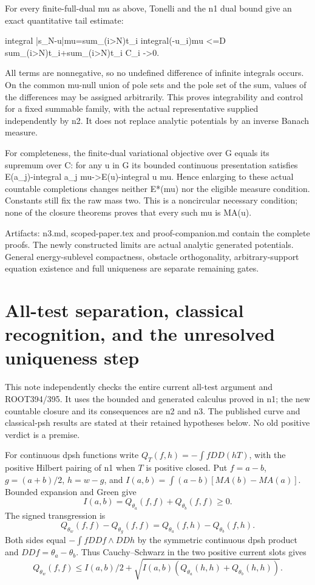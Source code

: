 \documentclass[11pt]{article}
\begin{document}
For every finite-full-dual mu as above, Tonelli and the n1 dual bound give an exact quantitative tail estimate:

integral |s\_N-u|mu=sum\_(i>N)t\_i integral(-u\_i)mu
<=D sum\_(i>N)t\_i+sum\_(i>N)t\_i C\_i ->0.

All terms are nonnegative, so no undefined difference of infinite integrals occurs. On the common mu-null union of pole sets and the pole set of the sum, values of the differences may be assigned arbitrarily. This proves integrability and control for a fixed summable family, with the actual representative supplied independently by n2. It does not replace analytic potentials by an inverse Banach measure.

For completeness, the finite-dual variational objective over G equals its supremum over C: for any u in G its bounded continuous presentation satisfies E(a\_j)-integral a\_j mu->E(u)-integral u mu. Hence enlarging to these actual countable completions changes neither E*(mu) nor the eligible measure condition. Constants still fix the raw mass two. This is a noncircular necessary condition; none of the closure theorems proves that every such mu is MA(u).

Artifacts: n3.md, scoped-paper.tex and proof-companion.md contain the complete proofs. The newly constructed limits are actual analytic generated potentials. General energy-sublevel compactness, obstacle orthogonality, arbitrary-support equation existence and full uniqueness are separate remaining gates.

\section*{All-test separation, classical recognition, and the unresolved uniqueness step}

This note independently checks the entire current all-test argument and ROOT394/395. It uses the bounded and generated calculus proved in n1; the new countable closure and its consequences are n2 and n3. The published curve and classical-psh results are stated at their retained hypotheses below. No old positive verdict is a premise.

For continuous dpsh functions write $Q_T(f,h)=-\int fDD(hT)$, with the positive Hilbert pairing of n1 when $T$ is positive closed. Put $f=a-b$, $g=(a+b)/2$, $h=w-g$, and $I(a,b)=\int(a-b)[MA(b)-MA(a)]$. Bounded expansion and Green give
\[
 I(a,b)=Q_{\theta_a}(f,f)+Q_{\theta_b}(f,f)\geq0.
\]
The signed transgression is
\[
 Q_{\theta_w}(f,f)-Q_{\theta_g}(f,f)
 =Q_{\theta_a}(f,h)-Q_{\theta_b}(f,h).
\]
Both sides equal $-\int fDDf\wedge DDh$ by the symmetric continuous dpsh product and $DDf=\theta_a-\theta_b$. Thus Cauchy--Schwarz in the two positive current slots gives
\[
 Q_{\theta_w}(f,f)\leq I(a,b)/2+
 \sqrt{I(a,b)(Q_{\theta_a}(h,h)+Q_{\theta_b}(h,h))}.
\]
\end{document}
